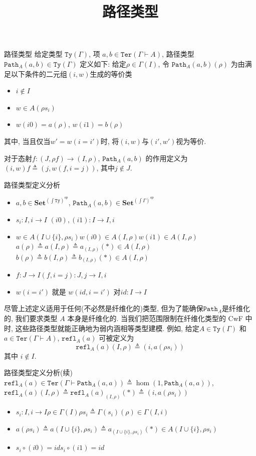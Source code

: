 \documentclass[aspectratio=169,xcolor=dvipsnames]{beamer}
\title{路径类型}
\date{}
\newcommand\Ty{\mathtt{Ty}}
\newcommand\Ter{\mathtt{Ter}}
\newcommand\Path{\mathtt{Path}}
\newcommand\Set{\mathbf{Set}}
\newcommand\refl{\mathtt{refl}}
\begin{document}
\begin{frame}
    \titlepage
\end{frame}

\begin{frame}[shrink]{路径类型}
给定类型 $\Ty(\Gamma)$, 项 $a,b\in\Ter(\Gamma\vdash A)$, 路径类型$\Path_{A}(a,b)\in\Ty(\Gamma)$ 定义如下: 给定$\rho\in\Gamma(I)$, 令 $\Path_{A}(a,b)(\rho)$ 为由满足以下条件的二元组$(i,w)$生成的等价类
\begin{itemize}
  \item $i\notin I$
  \item $w\in A(\rho s_{i})$
  \item $w(i0)=a(\rho)$, $w(i1)=b(\rho)$
\end{itemize}
其中, 当且仅当$w'=w(i=i')$时, 将$(i,w)$与$(i',w')$视为等价.

对于态射$f:(J,\rho f)\to(I,\rho)$, $\Path_{A}(a,b)$ 的作用定义为 $(i,w)f\triangleq(j,w(f,i=j))$, 其中$j\notin J$.
\end{frame}

\begin{frame}[shrink]{路径类型定义分析}
  \begin{itemize}
    \item $a,b \in \Set^{(\int\Ty)^{op}}$, $\Path_{A}(a,b)\in\Set^{(\int\Gamma)^{op}}$
    \item $s_{i} : I,i \to I$ \quad $(i0),(i1):I\to I,i$
    \item $w\in A(I\cup\{i\},\rho s_i)$\quad $w(i0)\in A(I,\rho)$\quad $w(i1)\in A(I,\rho)$\quad $a(\rho)\triangleq a(I,\rho)\triangleq a_{(I,\rho)}(\ast)\in A(I,\rho)$\quad $b(\rho)\triangleq b(I,\rho)\triangleq b_{(I,\rho)}(\ast)\in A(I,\rho)$
    \item $f:J\to I$\quad $(f,i=j) : J,j\to I,i$
    \item $w(i=i')$ 就是 $w(id,i=i')$ 对$id:I\to I$
  \end{itemize}

尽管上述定义适用于任何(不必然是纤维化的)类型, 但为了能确保$\Path_{A}$是纤维化的, 我们要求类型 $A$ 本身是纤维化的. 当我们把范围限制在纤维化类型的 CwF 中时, 这些路径类型就能正确地为弱内涵相等类型建模. 例如, 给定$A\in\Ty(\Gamma)$ 和 $a\in\Ter(\Gamma\vdash A)$, $\refl_{A}(a)$ 可被定义为
\[ \refl_{A}(a)(I,\rho)\triangleq (i,a(\rho s_i))\]
其中 $i\notin I$.
\end{frame}

\begin{frame}{路径类型定义分析(续)}
  $\refl_{A}(a)\in\Ter(\Gamma\vdash \Path_{A}(a,a))\triangleq\hom(1,\Path_A(a,a))$, $\refl_A(a)(I,\rho)\triangleq\refl_{A}(a)_{(I,\rho)}(\ast)\triangleq(i,a(\rho s_i))$
  \begin{itemize}
    \item $s_i : I,i\to I$\quad $\rho\in\Gamma(I)$\quad $\rho s_i\triangleq \Gamma(s_i)(\rho)\in\Gamma(I,i)$
    \item $a(\rho s_i)\triangleq a(I\cup\{i\},\rho s_i)\triangleq a_{(I\cup\{i\},\rho s_i)}(\ast)\in A(I\cup\{i\},\rho s_i)$
    \item $s_i\circ (i0) = id$\quad $s_i\circ (i1) = id$
  \end{itemize}
\end{frame}
\end{document}
